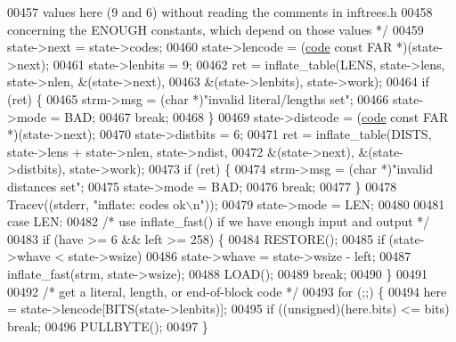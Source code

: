 \begin{DoxyCode}
{{{{00457 \textcolor{comment}{               values here (9 and 6) without reading the comments in inftrees.h}
00458 \textcolor{comment}{               concerning the ENOUGH constants, which depend on those values */}
00459             state->next = state->codes;
00460             state->lencode = (\hyperlink{structcode}{code} \textcolor{keyword}{const} FAR *)(state->next);
00461             state->lenbits = 9;
00462             ret = inflate\_table(LENS, state->lens, state->nlen, &(state->next),
00463                                 &(state->lenbits), state->work);
00464             \textcolor{keywordflow}{if} (ret) \{
00465                 strm->msg = (\textcolor{keywordtype}{char} *)\textcolor{stringliteral}{"invalid literal/lengths set"};
00466                 state->mode = BAD;
00467                 \textcolor{keywordflow}{break};
00468             \}
00469             state->distcode = (\hyperlink{structcode}{code} \textcolor{keyword}{const} FAR *)(state->next);
00470             state->distbits = 6;
00471             ret = inflate\_table(DISTS, state->lens + state->nlen, state->ndist,
00472                             &(state->next), &(state->distbits), state->work);
00473             \textcolor{keywordflow}{if} (ret) \{
00474                 strm->msg = (\textcolor{keywordtype}{char} *)\textcolor{stringliteral}{"invalid distances set"};
00475                 state->mode = BAD;
00476                 \textcolor{keywordflow}{break};
00477             \}
00478             Tracev((stderr, \textcolor{stringliteral}{"inflate:       codes ok\(\backslash\)n"}));
00479             state->mode = LEN;
00480 
00481         \textcolor{keywordflow}{case} LEN:
00482             \textcolor{comment}{/* use inflate\_fast() if we have enough input and output */}
00483             \textcolor{keywordflow}{if} (have >= 6 && left >= 258) \{
00484                 RESTORE();
00485                 \textcolor{keywordflow}{if} (state->whave < state->wsize)
00486                     state->whave = state->wsize - left;
00487                 inflate\_fast(strm, state->wsize);
00488                 LOAD();
00489                 \textcolor{keywordflow}{break};
00490             \}
00491 
00492             \textcolor{comment}{/* get a literal, length, or end-of-block code */}
00493             \textcolor{keywordflow}{for} (;;) \{
00494                 here = state->lencode[BITS(state->lenbits)];
00495                 \textcolor{keywordflow}{if} ((\textcolor{keywordtype}{unsigned})(here.bits) <= bits) \textcolor{keywordflow}{break};
00496                 PULLBYTE();
00497             \}
}}}}
\end{DoxyCode}
